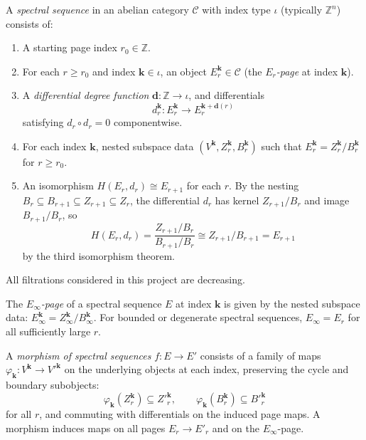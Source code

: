 \begin{definition}\label{prereq:def:spectral-sequence}
    \leanok
    A \emph{spectral sequence} in an abelian category $\mathcal{C}$ with index type $\iota$ (typically $\mathbb{Z}^n$) consists of:
    \begin{enumerate}
        \item A starting page index $r_0 \in \mathbb{Z}$.
        \item For each $r \ge r_0$ and index $\mathbf{k} \in \iota$, an object $E_r^{\mathbf{k}} \in \mathcal{C}$ (the \emph{$E_r$-page} at index $\mathbf{k}$).
        \item A \emph{differential degree function} $\mathbf{d}: \mathbb{Z} \to \iota$, and differentials
        $$d_r^{\mathbf{k}}: E_r^{\mathbf{k}} \to E_r^{\mathbf{k} + \mathbf{d}(r)}$$
        satisfying $d_r \circ d_r = 0$ componentwise.
        \item For each index $\mathbf{k}$, nested subspace data $(V^{\mathbf{k}}, Z_r^{\mathbf{k}}, B_r^{\mathbf{k}})$ such that $E_r^{\mathbf{k}} = Z_r^{\mathbf{k}} / B_r^{\mathbf{k}}$ for $r \ge r_0$.
        \item An isomorphism $H(E_r, d_r) \cong E_{r+1}$ for each $r$. By the nesting $B_r \subseteq B_{r+1} \subseteq Z_{r+1} \subseteq Z_r$, the differential $d_r$ has kernel $Z_{r+1}/B_r$ and image $B_{r+1}/B_r$, so
        $$H(E_r, d_r) = \frac{Z_{r+1}/B_r}{B_{r+1}/B_r} \cong Z_{r+1}/B_{r+1} = E_{r+1}$$
        by the third isomorphism theorem.
    \end{enumerate}
\end{definition}

\begin{remark}\label{prereq:rem:decreasing-filtration}
    All filtrations considered in this project are decreasing.
\end{remark}

\begin{definition}\label{prereq:def:einfty-data}
    \leanok
    The \emph{$E_\infty$-page} of a spectral sequence $E$ at index $\mathbf{k}$ is given by the nested subspace data: $E_\infty^{\mathbf{k}} = Z_\infty^{\mathbf{k}} / B_\infty^{\mathbf{k}}$. For bounded or degenerate spectral sequences, $E_\infty = E_r$ for all sufficiently large $r$.
\end{definition}

\begin{definition}\label{prereq:def:ss-morphism}
    \leanok
    A \emph{morphism of spectral sequences} $f: E \to E'$ consists of a family of maps $\varphi_{\mathbf{k}}: V^{\mathbf{k}} \to V'^{\mathbf{k}}$ on the underlying objects at each index, preserving the cycle and boundary subobjects:
    $$\varphi_{\mathbf{k}}(Z_r^{\mathbf{k}}) \subseteq Z'^{\mathbf{k}}_r, \qquad \varphi_{\mathbf{k}}(B_r^{\mathbf{k}}) \subseteq B'^{\mathbf{k}}_r$$
    for all $r$, and commuting with differentials on the induced page maps. A morphism induces maps on all pages $E_r \to E'_r$ and on the $E_\infty$-page.
\end{definition}

